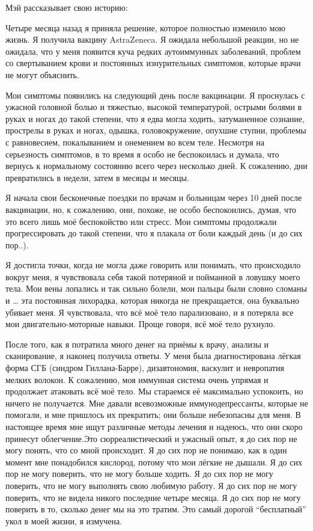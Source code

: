 Мэй рассказывает свою историю:

Четыре месяца назад я приняла решение, которое полностью изменило мою жизнь. Я
получила вакцину AstraZeneca. Я ожидала небольшой реакции, но не ожидала, что у
меня появится куча редких аутоиммунных заболеваний, проблем со свертыванием
крови и постоянных изнурительных симптомов, которые врачи не могут объяснить.

Мои симптомы появились на следующий день после вакцинации. Я проснулась с
ужасной головной болью и тяжестью, высокой температурой, острыми болями в руках
и ногах до такой степени, что я едва могла ходить, затуманенное сознание,
прострелы в руках и ногах, одышка, головокружение, опухшие ступни, проблемы с
равновесием, покалыванием и онемением во всем теле. Несмотря на серьезность
симптомов, в то время я особо не беспокоилась и думала, что вернусь к
нормальному состоянию всего через несколько дней. К сожалению, дни превратились
в недели, затем в месяцы и месяцы.

Я начала свои бесконечные поездки по врачам и больницам через 10 дней после
вакцинации, но, к сожалению, они, похоже, не особо беспокоились, думая, что это
всего лишь моё беспокойство или стресс. Мои симптомы продолжали прогрессировать
до такой степени, что я плакала от боли каждый день (и до сих пор..).

Я достигла точки, когда не могла даже говорить или понимать, что происходило
вокруг меня, я чувствовала себя такой потеряной и пойманной в ловушку моего
тела. Мои вены лопались и так сильно болели, мои пальцы были словно сломаны и …
эта постоянная лихорадка, которая никогда не прекращается, она буквально убивает
меня. Я чувствовала, что всё моё тело парализовано, и я потеряла все мои
двигательно-моторные навыки. Проще говоря, всё моё тело рухнуло.

После того, как я потратила много денег на приёмы к врачу, анализы и
сканирование, я наконец получила ответы. У меня была диагностирована лёгкая
форма СГБ (синдром Гиллана-Барре), дизавтономия, васкулит и невропатия мелких
волокон. К сожалению, моя иммунная система очень упрямая и продолжает атаковать
всё моё тело. Мы стараемся её максимально успокоить, но ничего не
получается. Мне давали всевозможные иммунодепрессанты, которые не помогали, и
мне пришлось их прекратить; они больше небезопасны для меня. В настоящее время
мне ищут различные методы лечения и надеюсь, что они скоро принесут
облегчение.Это сюрреалистический и ужасный опыт, я до сих пор не могу понять,
что со мной происходит. Я до сих пор не понимаю, как в один момент мне
понадобился кислород, потому что мои лёгкие не дышали. Я до сих пор не могу
поверить, что не могу больше ходить. Я до сих пор не могу поверить, что не могу
выполнять свою любимую работу. Я до сих пор не могу поверить, что не видела
никого последние четыре месяца. Я до сих пор не могу поверить в то, сколько
денег мы на это тратим. Это самый дорогой “бесплатный” укол в моей жизни, я
измучена.

